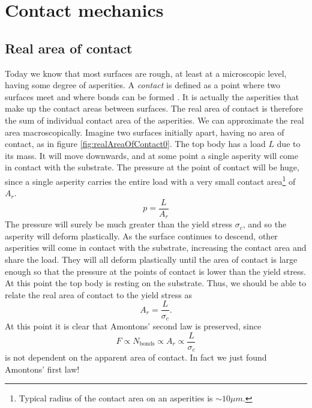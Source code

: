 \documentclass[twoside,english]{uiofysmaster}
\begin{document}
\section{Contact mechanics} \label{sec:contactMechanics}


\subsection{Real area of contact}
Today we know that most surfaces are rough, at least at a microscopic level, having some degree of asperities. 
A \textit{contact} is defined as a point where two surfaces meet and where bonds can be formed \cite{Introduction2Friction}.  
It is actually the asperities that make up the contact areas between surfaces.
The real area of contact is therefore the sum of individual contact area of the asperities. 
We can approximate the real area macroscopically. 
Imagine two surfaces initially apart, having no area of contact, as in figure \ref{fig:realAreaOfContact0}. 
The top body has a load $L$ due to its mass. 
It will move downwards, and at some point a single asperity will come in contact with the substrate.
The pressure at the point of contact will be huge, since a single asperity carries the entire load with a very small contact area\footnote{Typical radius of the contact area on an asperities is $\sim10 \mu m$.} of $A_r$.
\begin{equation}
	p = \frac{L}{A_r}
\end{equation}
The pressure will surely be much greater than the yield stress $\sigma_c$, and so the asperity will deform plastically. 
As the surface continues to descend, other asperities will come in contact with the substrate, increasing the contact area and share the load. 
They will all deform plastically until the area of contact is large enough so that the pressure at the points of contact is lower than the yield stress.
At this point the top body is resting on the substrate.
Thus, we should be able to relate the real area of contact to the yield stress as
\begin{equation}
	A_r =  \frac{L}{\sigma_c}.
\end{equation}
At this point it is clear that Amontons' second law is preserved, since 
\begin{equation}
	F\propto N_\text{bonds}\propto A_r \propto \frac{L}{\sigma_c}
\end{equation}
is not dependent on the apparent area of contact. 
In fact we just found Amontons' first law!
\end{document}
